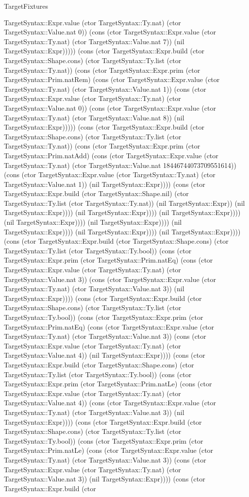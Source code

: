 \begin{lexlean}{TargetFixtures}
\begin{semanticmodule}
{TargetSyntax::Expr.value (ctor TargetSyntax::Ty.nat) (ctor TargetSyntax::Value.nat 0)) (cons (ctor TargetSyntax::Expr.value (ctor TargetSyntax::Ty.nat) (ctor TargetSyntax::Value.nat 7)) (nil TargetSyntax::Expr))))) (cons (ctor TargetSyntax::Expr.build (ctor TargetSyntax::Shape.cons) (ctor TargetSyntax::Ty.list (ctor TargetSyntax::Ty.nat)) (cons (ctor TargetSyntax::Expr.prim (ctor TargetSyntax::Prim.natRem) (cons (ctor TargetSyntax::Expr.value (ctor TargetSyntax::Ty.nat) (ctor TargetSyntax::Value.nat 1)) (cons (ctor TargetSyntax::Expr.value (ctor TargetSyntax::Ty.nat) (ctor TargetSyntax::Value.nat 0)) (cons (ctor TargetSyntax::Expr.value (ctor TargetSyntax::Ty.nat) (ctor TargetSyntax::Value.nat 8)) (nil TargetSyntax::Expr))))) (cons (ctor TargetSyntax::Expr.build (ctor TargetSyntax::Shape.cons) (ctor TargetSyntax::Ty.list (ctor TargetSyntax::Ty.nat)) (cons (ctor TargetSyntax::Expr.prim (ctor TargetSyntax::Prim.natAdd) (cons (ctor TargetSyntax::Expr.value (ctor TargetSyntax::Ty.nat) (ctor TargetSyntax::Value.nat 18446744073709551614)) (cons (ctor TargetSyntax::Expr.value (ctor TargetSyntax::Ty.nat) (ctor TargetSyntax::Value.nat 1)) (nil TargetSyntax::Expr)))) (cons (ctor TargetSyntax::Expr.build (ctor TargetSyntax::Shape.nil) (ctor TargetSyntax::Ty.list (ctor TargetSyntax::Ty.nat)) (nil TargetSyntax::Expr)) (nil TargetSyntax::Expr)))) (nil TargetSyntax::Expr)))) (nil TargetSyntax::Expr)))) (nil TargetSyntax::Expr)))) (nil TargetSyntax::Expr)))) (nil TargetSyntax::Expr)))) (nil TargetSyntax::Expr)))) (nil TargetSyntax::Expr)))) (cons (ctor TargetSyntax::Expr.build (ctor TargetSyntax::Shape.cons) (ctor TargetSyntax::Ty.list (ctor TargetSyntax::Ty.bool)) (cons (ctor TargetSyntax::Expr.prim (ctor TargetSyntax::Prim.natEq) (cons (ctor TargetSyntax::Expr.value (ctor TargetSyntax::Ty.nat) (ctor TargetSyntax::Value.nat 3)) (cons (ctor TargetSyntax::Expr.value (ctor TargetSyntax::Ty.nat) (ctor TargetSyntax::Value.nat 3)) (nil TargetSyntax::Expr)))) (cons (ctor TargetSyntax::Expr.build (ctor TargetSyntax::Shape.cons) (ctor TargetSyntax::Ty.list (ctor TargetSyntax::Ty.bool)) (cons (ctor TargetSyntax::Expr.prim (ctor TargetSyntax::Prim.natEq) (cons (ctor TargetSyntax::Expr.value (ctor TargetSyntax::Ty.nat) (ctor TargetSyntax::Value.nat 3)) (cons (ctor TargetSyntax::Expr.value (ctor TargetSyntax::Ty.nat) (ctor TargetSyntax::Value.nat 4)) (nil TargetSyntax::Expr)))) (cons (ctor TargetSyntax::Expr.build (ctor TargetSyntax::Shape.cons) (ctor TargetSyntax::Ty.list (ctor TargetSyntax::Ty.bool)) (cons (ctor TargetSyntax::Expr.prim (ctor TargetSyntax::Prim.natLe) (cons (ctor TargetSyntax::Expr.value (ctor TargetSyntax::Ty.nat) (ctor TargetSyntax::Value.nat 4)) (cons (ctor TargetSyntax::Expr.value (ctor TargetSyntax::Ty.nat) (ctor TargetSyntax::Value.nat 3)) (nil TargetSyntax::Expr)))) (cons (ctor TargetSyntax::Expr.build (ctor TargetSyntax::Shape.cons) (ctor TargetSyntax::Ty.list (ctor TargetSyntax::Ty.bool)) (cons (ctor TargetSyntax::Expr.prim (ctor TargetSyntax::Prim.natLe) (cons (ctor TargetSyntax::Expr.value (ctor TargetSyntax::Ty.nat) (ctor TargetSyntax::Value.nat 3)) (cons (ctor TargetSyntax::Expr.value (ctor TargetSyntax::Ty.nat) (ctor TargetSyntax::Value.nat 3)) (nil TargetSyntax::Expr)))) (cons (ctor TargetSyntax::Expr.build (ctor }
\end{semanticmodule}
\end{lexlean}

